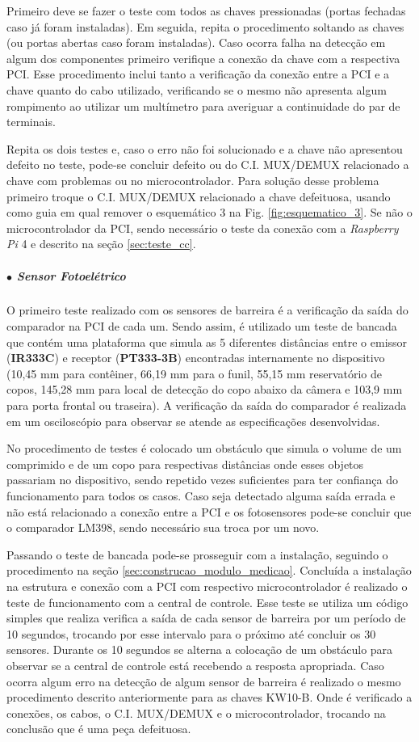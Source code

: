 Primeiro deve se fazer o teste com todos as chaves pressionadas (portas fechadas caso já foram instaladas). Em seguida, repita o procedimento soltando as chaves (ou portas abertas caso foram instaladas). Caso ocorra falha na detecção em algum dos componentes primeiro verifique a conexão da chave com a respectiva PCI. Esse procedimento inclui tanto a verificação da conexão entre a PCI e a chave quanto do cabo utilizado, verificando se o mesmo não apresenta algum rompimento ao utilizar um multímetro para averiguar a continuidade do par de terminais. 

Repita os dois testes e, caso o erro não foi solucionado e a chave não apresentou defeito no teste, pode-se concluir defeito ou do C.I. MUX/DEMUX relacionado a chave com problemas ou no microcontrolador. Para solução desse problema primeiro troque o C.I. MUX/DEMUX relacionado a chave defeituosa, usando como guia em qual remover o esquemático 3 na Fig. \ref{fig:esquematico_3}. Se não o microcontrolador da PCI, sendo necessário o teste da conexão com a \textit{Raspberry Pi} 4 e descrito na seção \ref{sec:teste_cc}.

\subparagraph*{$\bullet$ Sensor Fotoelétrico} \hfill

O primeiro teste realizado com os sensores de barreira é a verificação da saída do comparador na PCI de cada um. Sendo assim, é utilizado um teste de bancada que contém uma plataforma que simula as 5 diferentes distâncias entre o emissor (\textbf{IR333C}) e receptor (\textbf{PT333-3B}) encontradas internamente no dispositivo (10,45 mm para contêiner, 66,19 mm para o funil, 55,15 mm reservatório de copos, 145,28 mm para local de detecção do copo abaixo da câmera e 103,9 mm para porta frontal ou traseira). A verificação da saída do comparador é realizada em um osciloscópio para observar se atende as especificações desenvolvidas. 

No procedimento de testes é colocado um obstáculo que simula o volume de um comprimido e de um copo para respectivas distâncias onde esses objetos passariam no dispositivo, sendo repetido vezes suficientes para ter confiança do funcionamento para todos os casos. Caso seja detectado alguma saída errada e não está relacionado a conexão entre a PCI e os fotosensores pode-se concluir que o comparador LM398, sendo necessário sua troca por um novo. 

Passando o teste de bancada pode-se prosseguir com a instalação, seguindo o procedimento na seção \ref{sec:construcao_modulo_medicao}. Concluída a instalação na estrutura e conexão com a PCI com respectivo microcontrolador é realizado o teste de funcionamento com a central de controle. Esse teste se utiliza um código simples que realiza verifica a saída de cada sensor de barreira por um período de 10 segundos, trocando por esse intervalo para o próximo até concluir os 30 sensores. Durante os 10 segundos se alterna a colocação de um obstáculo para observar se a central de controle está recebendo a resposta apropriada. Caso ocorra algum erro na detecção de algum sensor de barreira é realizado o mesmo procedimento descrito anteriormente para as chaves KW10-B. Onde é verificado a conexões, os cabos, o C.I. MUX/DEMUX e o microcontrolador, trocando na conclusão que é uma peça defeituosa.


